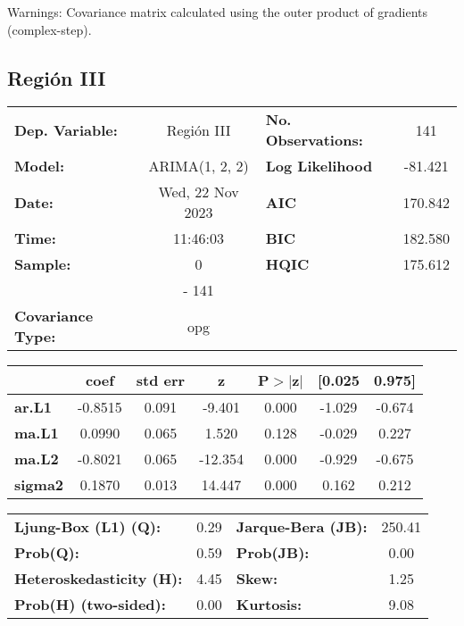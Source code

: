 \documentclass{article}%
\begin{document}
Warnings: \newline
 [1] Covariance matrix calculated using the outer product of gradients (complex-step).%
\subsection*{Región III}%
\begin{center}
\begin{tabular}{lclc}
\toprule
\textbf{Dep. Variable:}          &    Región III    & \textbf{  No. Observations:  } &    141      \\
\textbf{Model:}                  &  ARIMA(1, 2, 2)  & \textbf{  Log Likelihood     } &  -81.421    \\
\textbf{Date:}                   & Wed, 22 Nov 2023 & \textbf{  AIC                } &  170.842    \\
\textbf{Time:}                   &     11:46:03     & \textbf{  BIC                } &  182.580    \\
\textbf{Sample:}                 &        0         & \textbf{  HQIC               } &  175.612    \\
\textbf{}                        &       - 141      & \textbf{                     } &             \\
\textbf{Covariance Type:}        &       opg        & \textbf{                     } &             \\
\bottomrule
\end{tabular}
\begin{tabular}{lcccccc}
                & \textbf{coef} & \textbf{std err} & \textbf{z} & \textbf{P$> |$z$|$} & \textbf{[0.025} & \textbf{0.975]}  \\
\midrule
\textbf{ar.L1}  &      -0.8515  &        0.091     &    -9.401  &         0.000        &       -1.029    &       -0.674     \\
\textbf{ma.L1}  &       0.0990  &        0.065     &     1.520  &         0.128        &       -0.029    &        0.227     \\
\textbf{ma.L2}  &      -0.8021  &        0.065     &   -12.354  &         0.000        &       -0.929    &       -0.675     \\
\textbf{sigma2} &       0.1870  &        0.013     &    14.447  &         0.000        &        0.162    &        0.212     \\
\bottomrule
\end{tabular}
\begin{tabular}{lclc}
\textbf{Ljung-Box (L1) (Q):}     & 0.29 & \textbf{  Jarque-Bera (JB):  } & 250.41  \\
\textbf{Prob(Q):}                & 0.59 & \textbf{  Prob(JB):          } &  0.00   \\
\textbf{Heteroskedasticity (H):} & 4.45 & \textbf{  Skew:              } &  1.25   \\
\textbf{Prob(H) (two-sided):}    & 0.00 & \textbf{  Kurtosis:          } &  9.08   \\
\bottomrule
\end{tabular}
\end{center}
\end{document}
